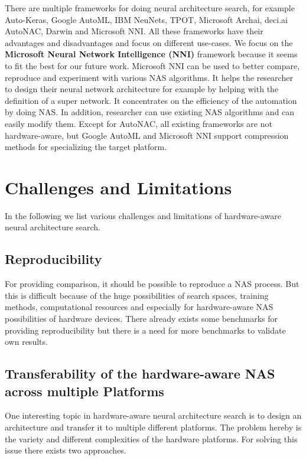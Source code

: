 \documentclass[conference]{IEEEtran}
\begin{document}
There are multiple frameworks for doing neural architecture search, for example Auto-Keras, Google AutoML, IBM NeuNets, TPOT, Microsoft Archai, deci.ai AutoNAC, Darwin and Microsoft NNI. All these frameworks have their advantages and disadvantages and focus on different use-cases. We focus on the \textbf{Microsoft Neural Network Intelligence (NNI)} framework because it seems to fit the best for our future work. Microsoft NNI can be used to better compare, reproduce and experiment with various NAS algorithms. It helps the researcher to design their neural network architecture for example by helping with the definition of a super network. It concentrates on the efficiency of the automation by doing NAS. In addition, researcher can use existing NAS algorithms and can easily modify them. Except for AutoNAC, all existing frameworks are not hardware-aware, but Google AutoML and Microsoft NNI support compression methods for specializing the target platform. 

\section{Challenges and Limitations}
\label{section:Challenges}

In the following we list various challenges and limitations of hardware-aware neural architecture search. 

\subsection{Reproducibility}

For providing comparison, it should be possible to reproduce a NAS process. But this is difficult because of the huge possibilities of search spaces, training methods, computational resources and especially for hardware-aware NAS possibilities of hardware devices. There already exists some benchmarks for providing reproducibility but there is a need for more benchmarks to validate own results.
 
\subsection{Transferability of the hardware-aware NAS across multiple Platforms}

One interesting topic in hardware-aware neural architecture search is to design an architecture and transfer it to multiple different platforms. The problem hereby is the variety and different complexities of the hardware platforms. For solving this issue there exists two approaches.
\end{document}
